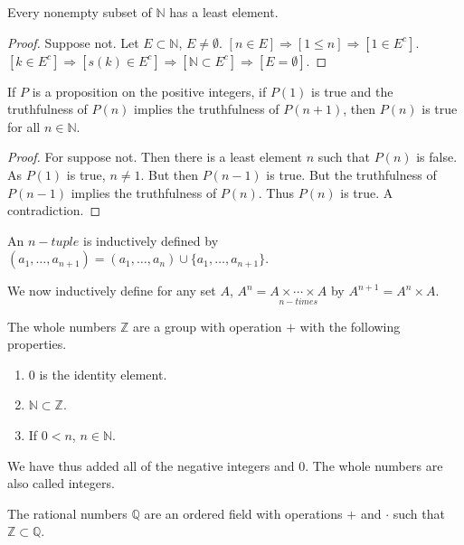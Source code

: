 \documentclass[crop=false,class=article,oneside]{standalone}
\begin{document}
    \begin{theorem}
    Every nonempty subset of $\mathbb{N}$ has a least element.
    \end{theorem}
    \begin{proof}
    Suppose not. Let $E\subset \mathbb{N}$, $E\ne\emptyset$. $[n\in E]\Rightarrow [1\leq n]\Rightarrow [1\in E^c]$. $[k\in E^c]\Rightarrow [s(k)\in E^c]\Rightarrow [\mathbb{N} \subset E^c]\Rightarrow [E = \emptyset]$.
    \end{proof}
    \begin{theorem}
    If $P$ is a proposition on the positive integers, if $P(1)$ is true and the truthfulness of $P(n)$ implies the truthfulness of $P(n+1)$, then $P(n)$ is true for all $n\in \mathbb{N}$.
    \end{theorem}
    \begin{proof}
    For suppose not. Then there is a least element $n$ such that $P(n)$ is false. As $P(1)$ is true, $n\ne 1$. But then $P(n-1)$ is true. But the truthfulness of $P(n-1)$ implies the truthfulness of $P(n)$. Thus $P(n)$ is true. A contradiction.
    \end{proof}
    \begin{definition}
    An $n-tuple$ is inductively defined by $(a_1,\hdots,a_{n+1}) = (a_1,\hdots, a_n)\cup \{a_1,\hdots,a_{n+1}\}$.
    \end{definition}
    \begin{definition}
    We now inductively define for any set $A$, $A^{n} = \underset{n-times}{A\times \cdots \times A}$ by $A^{n+1} = A^n \times A$.
    \end{definition}
    \begin{definition}
    The whole numbers $\mathbb{Z}$ are a group with operation $+$ with the following properties.
    \begin{enumerate}
    \item $0$ is the identity element.
    \item $\mathbb{N}\subset \mathbb{Z}$.
    \item If $0<n$, $n\in \mathbb{N}$.
    \end{enumerate}
    \end{definition}
    \begin{remark}
    We have thus added all of the negative integers and $0$. The whole numbers are also called integers.
    \end{remark}
    \begin{definition}
    The rational numbers $\mathbb{Q}$ are an ordered field with operations $+$ and $\cdot$ such that $\mathbb{Z}\subset \mathbb{Q}$.
    \end{definition}
\end{document}
